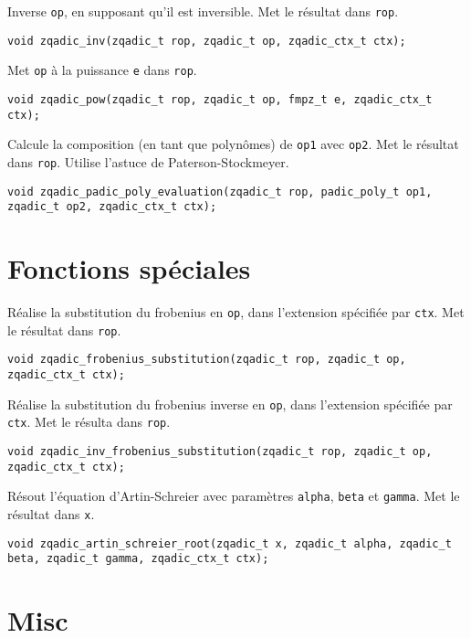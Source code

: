 \documentclass[11pt]{article}
\begin{document}
Inverse \texttt{op}, en supposant qu'il est inversible. Met le résultat dans \texttt{rop}.
\begin{verbatim}
void zqadic_inv(zqadic_t rop, zqadic_t op, zqadic_ctx_t ctx);
\end{verbatim}

Met \texttt{op} à la puissance \texttt{e} dans \texttt{rop}.
\begin{verbatim}
void zqadic_pow(zqadic_t rop, zqadic_t op, fmpz_t e, zqadic_ctx_t ctx);
\end{verbatim}

Calcule la composition (en tant que polynômes) de \texttt{op1} avec \texttt{op2}. Met le résultat dans \texttt{rop}. Utilise l'astuce de Paterson-Stockmeyer.
\begin{verbatim}
void zqadic_padic_poly_evaluation(zqadic_t rop, padic_poly_t op1, zqadic_t op2, zqadic_ctx_t ctx);
\end{verbatim}


\section{Fonctions spéciales}

Réalise la substitution du frobenius en \texttt{op}, dans l'extension spécifiée par \texttt{ctx}. Met le résultat dans \texttt{rop}.
\begin{verbatim}
void zqadic_frobenius_substitution(zqadic_t rop, zqadic_t op, zqadic_ctx_t ctx);
\end{verbatim}

Réalise la substitution du frobenius inverse en \texttt{op}, dans l'extension spécifiée par \texttt{ctx}. Met le résulta dans \texttt{rop}.
\begin{verbatim}
void zqadic_inv_frobenius_substitution(zqadic_t rop, zqadic_t op, zqadic_ctx_t ctx);
\end{verbatim}

Résout l'équation d'Artin-Schreier avec paramètres \texttt{alpha}, \texttt{beta} et \texttt{gamma}. Met le résultat dans \texttt{x}.
\begin{verbatim}
void zqadic_artin_schreier_root(zqadic_t x, zqadic_t alpha, zqadic_t beta, zqadic_t gamma, zqadic_ctx_t ctx);
\end{verbatim}


\section{Misc}
\end{document}
